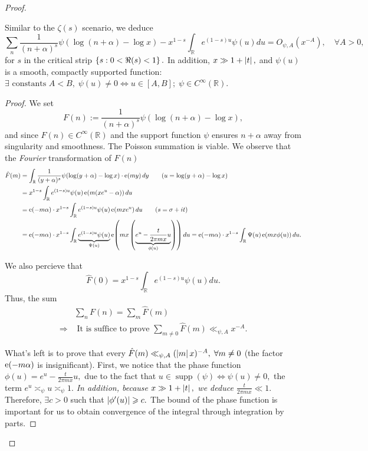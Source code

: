 \begin{proof}
\begin{lemma}
    Similar to the $\zeta(s)$ scenario, we deduce 
    \begin{equation}
        \sum_n \frac{1}{(n+\alpha)^s} \psi(\log (n + \alpha) - \log x) - x^{1-s} \int_{\mathbb{R}} e^{(1-s)u} \psi(u) du = O_{\psi, A}(x^{-A}), \quad \forall A > 0,
    \end{equation}
    for $s$ in the critical strip $\left\{ s: 0 < \Re(s) < 1 \right\}.$ In addition, $x \gg 1 + \left\lvert t \right\rvert,$ and $\psi(u)$ is a smooth, compactly supported function: $\exists \text{ constants } A < B, \; \psi(u) \neq 0 \Leftrightarrow u \in [A,B]; \; \psi \in C^\infty(\mathbb{R}).$ 
\end{lemma}
\begin{proof}
We set $$F(n) := \frac{1}{(n+\alpha)^s} \psi(\log (n + \alpha) - \log x),$$ and since $F(n) \in C^\infty(\mathbb{R})$ and the support function $\psi$ ensures $n + \alpha$ away from singularity and smoothness. The Poisson summation is viable. We observe that the \emph{Fourier} transformation of $F(n)$
\begin{align*}
    \hat{F}(m) &= \int_{\mathbb{R}} \frac{1}{(y + \alpha)^s} \psi(\log (y + \alpha) - \log x) \cdot \e{my} dy \qquad (u = \log(y + \alpha) - \log x) \\
    &= x^{1-s} \int_{\mathbb{R}} e^{(1-s)u} \psi(u) \e{m(xe^u - \alpha)} du \\
    &= \e{-m \alpha} \cdot x^{1-s} \int_{\mathbb{R}} e^{(1-s)u} \psi(u) \e{mxe^u} du \qquad (s = \sigma + it) \\ 
    &= \e{-m \alpha} \cdot x^{1-s} \int_{\mathbb{R}} \underbrace{e^{(1-s)u} \psi(u)}_{\Psi(u)} \e{mx \left( \underbrace{e^u-\frac{t}{2\pi mx}u}_{\phi(u)} \right)} du = \e{-m \alpha} \cdot x^{1-s} \int_{\mathbb{R}} \Psi(u) \e{mx \phi(u)} du.
\end{align*}

We also percieve that 
\begin{equation}
    \hat{F}(0) = x^{1-s} \int_{\mathbb{R}} e^{(1-s)u} \psi(u) du.
\end{equation}
Thus, the sum
\begin{align*}
    &\sum_n F(n) = \sum_{m} \hat{F}(m) \\
    \Longrightarrow &\text{ It is suffice to prove } \sum_{m \neq 0} \hat{F}(m) \ll_{\psi,A} x^{-A}.
\end{align*}

What's left is to prove that every $\hat{F}(m) \ll_{\psi,A} (\left\lvert m \right\rvert x)^{-A},\; \forall m \neq 0$ (the factor $\operatorname{e} \! \left( -m\alpha \right)$ is insignificant). First, we notice that the phase function $\phi(u) = e^u-\frac{t}{2\pi mx}u,$ due to the fact that $u \in \operatorname{supp}(\psi) \iff \psi(u) \neq 0,$ the term $e^u \asymp_\psi u \asymp_\psi 1.$ \emph{In addition, because $x \gg 1 + \left\lvert t \right\rvert,$ we deduce $\frac{t}{2\pi mx} \ll 1.$} Therefore, $\exists c > 0$ such that $\left\lvert \phi'(u) \right\rvert \geqslant c.$ The bound of the phase function is important for us to obtain convergence of the integral through integration by parts.


\end{proof}
\end{proof}
